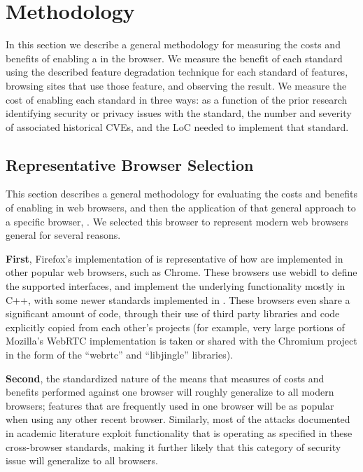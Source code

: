 \section{Methodology}
\label{cost-benefit:methodology}

In this section we describe a general methodology for measuring the costs and
benefits of enabling a \WAS in the browser.  We measure the benefit of each
standard using the described feature degradation technique for each standard of features, browsing
sites that use those feature, and observing the result.  We
measure the cost of enabling each standard in three ways: as a function of
the prior research identifying security or privacy issues with the
standard, the number and severity of associated historical CVEs, and the LoC
needed to implement that standard.

\subsection{Representative Browser Selection}
\label{cost-benefit:methodology:methodology-browser}
This section describes a general methodology for evaluating the costs and
benefits of enabling \WASs in web browsers, and then the application of that
general approach to a specific browser, \textbf{\FFWithVersion}.  We selected
this browser to represent modern web browsers general for several reasons.

\textbf{First}, Firefox's implementation of \WASs is representative of how \WASs
are implemented in other popular web browsers, such as Chrome.  These browsers
use \gls{webidl} to define the supported \WAPI interfaces, and implement the underlying functionality
mostly in C++, with some newer standards implemented in \JS.  These browsers even
share a significant amount of code, through their use
of third party libraries and code explicitly copied from each other's projects
(for example, very large portions of Mozilla's WebRTC implementation is taken or
shared with the Chromium project in the form of the ``webrtc'' and ``libjingle''
libraries).


\textbf{Second}, the standardized nature of the \WAPI means that measures of
\WAPI costs and benefits performed against one browser will roughly generalize to
all modern browsers; features that are frequently used in one browser will be
as popular when using any other recent browser.
Similarly, most of the attacks documented in academic literature exploit
functionality that is operating as specified in these cross-browser standards,
making it further likely that this category of security issue will generalize
to all browsers.

